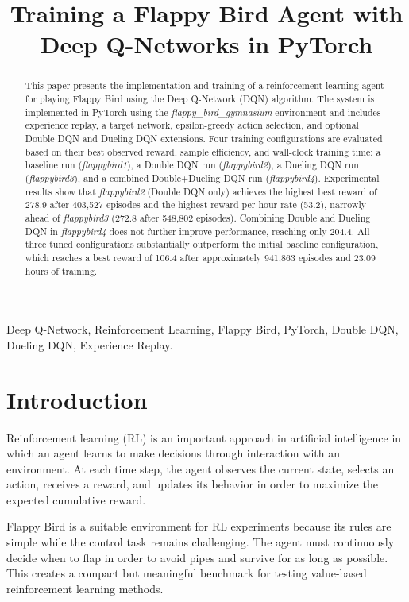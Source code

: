 \documentclass[conference]{IEEEtran}
\title{Training a Flappy Bird Agent with Deep Q-Networks in PyTorch}
\author{%
    \IEEEauthorblockN{Tran Van Thuan}
    \IEEEauthorblockA{\textit{Fill in your institution}\\\textit{Fill in your email}}
    \and
    \IEEEauthorblockN{Nguyen Vo Hoang Khang}
    \IEEEauthorblockA{ \textit{FPT University}\\ \textit{khangnvhse184634@fpt.edu.vn}}
}
\begin{document}
\maketitle

\begin{abstract}
This paper presents the implementation and training of a reinforcement learning agent for playing Flappy Bird using the Deep Q-Network (DQN) algorithm. The system is implemented in PyTorch using the \textit{flappy\_bird\_gymnasium} environment and includes experience replay, a target network, epsilon-greedy action selection, and optional Double DQN and Dueling DQN extensions. Four training configurations are evaluated based on their best observed reward, sample efficiency, and wall-clock training time: a baseline run (\textit{flappybird1}), a Double DQN run (\textit{flappybird2}), a Dueling DQN run (\textit{flappybird3}), and a combined Double+Dueling DQN run (\textit{flappybird4}). Experimental results show that \textit{flappybird2} (Double DQN only) achieves the highest best reward of 278.9 after 403,527 episodes and the highest reward-per-hour rate (53.2), narrowly ahead of \textit{flappybird3} (272.8 after 548,802 episodes). Combining Double and Dueling DQN in \textit{flappybird4} does not further improve performance, reaching only 204.4. All three tuned configurations substantially outperform the initial baseline configuration, which reaches a best reward of 106.4 after approximately 941,863 episodes and 23.09 hours of training.
\end{abstract}

\begin{IEEEkeywords}
Deep Q-Network, Reinforcement Learning, Flappy Bird, PyTorch, Double DQN, Dueling DQN, Experience Replay.
\end{IEEEkeywords}

\section{Introduction}
Reinforcement learning (RL) is an important approach in artificial intelligence in which an agent learns to make decisions through interaction with an environment. At each time step, the agent observes the current state, selects an action, receives a reward, and updates its behavior in order to maximize the expected cumulative reward.

Flappy Bird is a suitable environment for RL experiments because its rules are simple while the control task remains challenging. The agent must continuously decide when to flap in order to avoid pipes and survive for as long as possible. This creates a compact but meaningful benchmark for testing value-based reinforcement learning methods.
\end{document}
